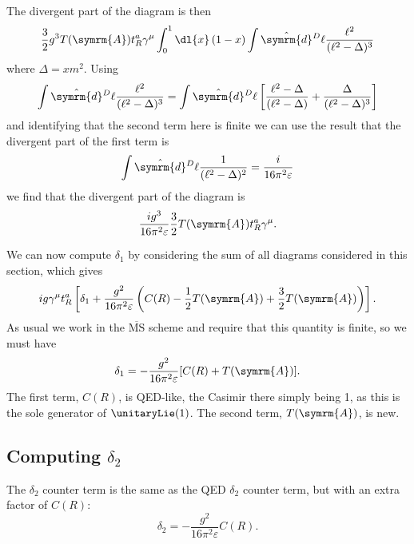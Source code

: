 \documentclass[fleqn]{NotesClass}
\newcommand{\MSbar}{\ensuremath{\overline{\text{MS}}}}
\newcommand{\dhat}[1]{\hat{\symrm{d}}{#1}}
\newcommand{\adjointRep}{\symrm{A}}
\begin{document}
    The divergent part of the diagram is then
    \begin{equation}
        \frac{3}{2}g^3 T(\adjointRep)t_R^a \gamma^\mu \int_0^1 \dl{x} \, (1 - x) \int \dhat{^D\ell} \frac{\ell^2}{(\ell^2 - \Delta)^3}
    \end{equation}
    where \(\Delta = xm^2\).
    Using
    \begin{equation}
        \int \dhat{^D\ell} \frac{\ell^2}{(\ell^2 - \Delta)^3} = \int \dhat{^D\ell} \left[ \frac{\ell^2 - \Delta}{(\ell^2 - \Delta)} + \frac{\Delta}{(\ell^2 - \Delta)^3} \right]
    \end{equation}
    and identifying that the second term here is finite we can use the result that the divergent part of the first term is
    \begin{equation}
        \int \dhat{^D\ell} \frac{1}{(\ell^2 - \Delta)^2} = \frac{i}{16\pi^2\varepsilon}
    \end{equation}
    we find that the divergent part of the diagram is
    \begin{equation}
        \frac{ig^3}{16\pi^2\varepsilon} \frac{3}{2}T(\adjointRep)t_R^a\gamma^\mu.
    \end{equation}
    
    We can now compute \(\delta_1\) by considering the sum of all diagrams considered in this section, which gives
    \begin{equation}
        ig\gamma^\mu t_R^a \left[ \delta_1 + \frac{g^2}{16\pi^2\varepsilon} \left( C(R) - \frac{1}{2}T(\adjointRep) + \frac{3}{2}T(\adjointRep) \right) \right].
    \end{equation}
    As usual we work in the \MSbar{} scheme and require that this quantity is finite, so we must have
    \begin{equation}
        \delta_1 = -\frac{g^2}{16\pi^2\varepsilon}[C(R) + T(\adjointRep)].
    \end{equation}
    The first term, \(C(R)\), is QED-like, the Casimir there simply being 1, as this is the sole generator of \(\unitaryLie(1)\).
    The second term, \(T(\adjointRep)\), is new.
    
    \subsection{Computing \texorpdfstring{\(\delta_2\)}{delta 2}}
    The \(\delta_2\) counter term is the same as the QED \(\delta_2\) counter term, but with an extra factor of \(C(R)\):
    \begin{equation}
        \delta_2 = -\frac{g^2}{16\pi^2\varepsilon} C(R).
    \end{equation}
    
\end{document}
